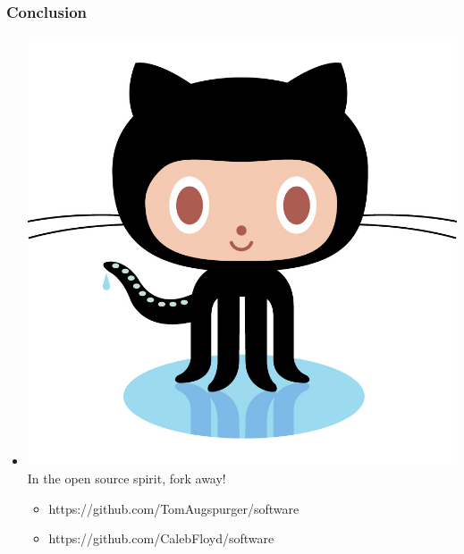 \documentclass{beamer}
\begin{document}
\begin{frame}[t]\frametitle{Conclusion}
  \begin{itemize}
\vspace{2mm}
    \item \includegraphics[scale=.025]{octocat.jpg} In the open source spirit, fork away!
    \begin{itemize}
      \item https://github.com/TomAugspurger/software
      \item https://github.com/CalebFloyd/software
    \end{itemize}

  \end{itemize}    
\end{frame}
\end{document}
